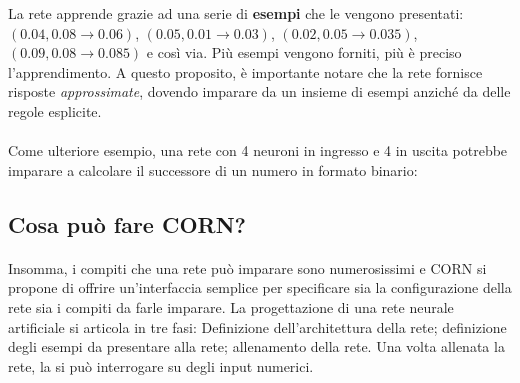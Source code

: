 \documentclass[12pt]{article}
\begin{document}
La rete apprende grazie ad una serie di \textbf{esempi} che le vengono presentati: $(0.04, 0.08 \rightarrow 0.06)$, $(0.05, 0.01 \rightarrow 0.03)$, $(0.02, 0.05 \rightarrow 0.035)$, $(0.09, 0.08 \rightarrow 0.085)$ e così via. Più esempi vengono forniti, più è preciso l'apprendimento. A questo proposito, è importante notare che la rete fornisce risposte \textit{approssimate}, dovendo imparare da un insieme di esempi anziché da delle regole esplicite.

\paragraph{}
Come ulteriore esempio, una rete con 4 neuroni in ingresso e 4 in uscita potrebbe imparare a calcolare il successore di un numero in formato binario:

\begin{center}
\end{center}

\subsection{Cosa può fare \textsc{CORN}?}

\paragraph{}
Insomma, i compiti che una rete può imparare sono numerosissimi e \textsc{CORN} si propone di offrire un'interfaccia semplice per specificare sia la configurazione della rete sia i compiti da farle imparare. La progettazione di una rete neurale artificiale si articola in tre fasi: Definizione dell'architettura della rete; definizione degli esempi da presentare alla rete; allenamento della rete. Una volta allenata la rete, la si può interrogare su degli input numerici.
\end{document}
